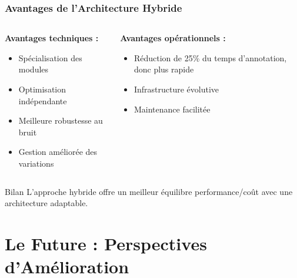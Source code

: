 \documentclass[
	11pt,
	aspectratio=169,
]{beamer}
\begin{document}
\begin{frame}
	\frametitle{Avantages de l'Architecture Hybride}
	
	\begin{columns}[t]
		\begin{column}{0.5\textwidth}
			\textbf{Avantages techniques :}
			\begin{itemize}
				\item Spécialisation des modules
				\item Optimisation indépendante
				\item Meilleure robustesse au bruit
				\item Gestion améliorée des variations
			\end{itemize}
		\end{column}
		
		\begin{column}{0.5\textwidth}
			\textbf{Avantages opérationnels :}
			\begin{itemize}
				\item Réduction de 25\% du temps d'annotation, donc plus rapide
				\item Infrastructure évolutive
				\item Maintenance facilitée
			\end{itemize}
		\end{column}
	\end{columns}
	
	\bigskip
	
	\begin{exampleblock}{Bilan}
		L'approche hybride offre un meilleur équilibre performance/coût avec une architecture adaptable.
	\end{exampleblock}
\end{frame}


\section{Le Future : Perspectives d'Amélioration}
\end{document}
